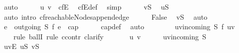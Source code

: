 \begin{isabellebody}
\ auto\isanewline
\ \ \ \ \isamarkupfalse%
\ {\isachardoublequoteopen}{\isacharparenleft}u{\isacharcomma}\ v{\isacharparenright}\ {\isasymin}\ cf{\isachardot}E{\isachardoublequoteclose}\ \isamarkupfalse%
\ cf{\isachardot}E{\isacharunderscore}def\ \isamarkupfalse%
\ simp\isanewline
\ \ \ \ \isamarkupfalse%
\ {\isachardoublequoteopen}v{\isasymin}{\isacharquery}S{\isachardoublequoteclose}\ \isamarkupfalse%
\ {\isacartoucheopen}u{\isasymin}{\isacharquery}S{\isacartoucheclose}\ \isamarkupfalse%
\ {\isacharparenleft}auto\ intro{\isacharcolon}\ cf{\isachardot}reachableNodes{\isacharunderscore}append{\isacharunderscore}edge{\isacharparenright}\isanewline
\ \ \ \ \isamarkupfalse%
\ False\ \isamarkupfalse%
\ {\isacartoucheopen}v{\isasymnotin}{\isacharquery}S{\isacartoucheclose}\ \isamarkupfalse%
\ auto\isanewline
\ \ \isamarkupfalse%
\ \ \isanewline
\ \ \isamarkupfalse%
\ {\isachardoublequoteopen}{\isacharparenleft}{\isasymSum}e\ {\isasymin}\ outgoing{\isacharprime}\ {\isacharquery}S{\isachardot}\ f\ e{\isacharparenright}\ {\isacharequal}\ cap{\isachardoublequoteclose}\isanewline
\ \ \ \ \isamarkupfalse%
\ cap{\isacharunderscore}def\ \isamarkupfalse%
\ auto\isanewline
\ \ \isamarkupfalse%
\ \isanewline
\ \ \isamarkupfalse%
\ {\isachardoublequoteopen}{\isasymforall}{\isacharparenleft}u{\isacharcomma}v{\isacharparenright}{\isasymin}incoming{\isacharprime}\ {\isacharquery}S{\isachardot}\ f\ {\isacharparenleft}u{\isacharcomma}v{\isacharparenright}\ {\isacharequal}\ {}{\isachardoublequoteclose}\ \ \isanewline
\ \ \isamarkupfalse%
\ {\isacharparenleft}rule\ ballI{\isacharcomma}\ rule\ ccontr{\isacharcomma}\ clarify{\isacharparenright}\ %
\isanewline
\ \ \ \ \isamarkupfalse%
\ u\ v\isanewline
\ \ \ \ \isamarkupfalse%
\ {\isachardoublequoteopen}{\isacharparenleft}u{\isacharcomma}v{\isacharparenright}{\isasymin}incoming{\isacharprime}\ {\isacharquery}S{\isachardoublequoteclose}\isanewline
\ \ \ \ \isamarkupfalse%
\ {\isachardoublequoteopen}{\isacharparenleft}u{\isacharcomma}v{\isacharparenright}{\isasymin}E{\isachardoublequoteclose}\ {\isachardoublequoteopen}u{\isasymnotin}{\isacharquery}S{\isachardoublequoteclose}\ {\isachardoublequoteopen}v{\isasymin}{\isacharquery}S{\isachardoublequoteclose}\ \isamarkupfalse%

\end{isabellebody}
